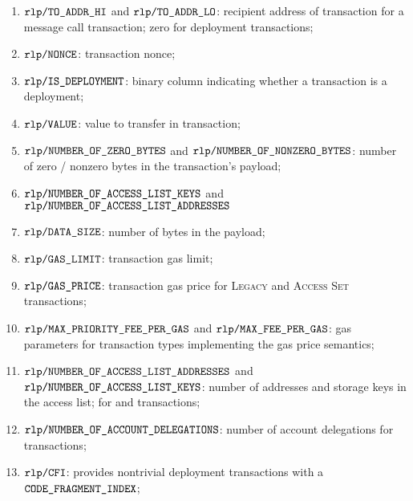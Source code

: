 \begin{enumerate}[resume]
	\item
		$\texttt{rlp} \texttt{/}{\texttt{TO\_ADDR\_HI}}$ and
		$\texttt{rlp} \texttt{/}{\texttt{TO\_ADDR\_LO}}$:
		recipient address of transaction for a message call transaction;
		zero for deployment transactions;
	\item
		$\texttt{rlp} \texttt{/}{\texttt{NONCE}}$:
		transaction nonce;
	\item
		$\texttt{rlp} \texttt{/}{\texttt{IS\_DEPLOYMENT}}$:
		binary column indicating whether a transaction is a deployment;
	\item
		$\texttt{rlp} \texttt{/}{\texttt{VALUE}}$:
		value to transfer in transaction;
	\item
		$\texttt{rlp} \texttt{/}{\texttt{NUMBER\_OF\_ZERO\_BYTES}}$ and
		$\texttt{rlp} \texttt{/}{\texttt{NUMBER\_OF\_NONZERO\_BYTES}}$:
		number of zero / nonzero bytes in the transaction's payload;
	\item
		$\texttt{rlp} \texttt{/}{\texttt{NUMBER\_OF\_ACCESS\_LIST\_KEYS}}$ and
		$\texttt{rlp} \texttt{/}{\texttt{NUMBER\_OF\_ACCESS\_LIST\_ADDRESSES}}$
	\item
		$\texttt{rlp} \texttt{/}{\texttt{DATA\_SIZE}}$:
		number of bytes in the payload;
	\item
		$\texttt{rlp} \texttt{/}{\texttt{GAS\_LIMIT}}$:
		transaction gas limit;
	\item
		$\texttt{rlp} \texttt{/}{\texttt{GAS\_PRICE}}$:
		transaction gas price for
		\textsc{Legacy} and
		\textsc{Access Set} transactions;
	\item
		$\texttt{rlp} \texttt{/}{\texttt{MAX\_PRIORITY\_FEE\_PER\_GAS}} $ and
		$\texttt{rlp} \texttt{/}{\texttt{MAX\_FEE\_PER\_GAS}}         $:
		gas parameters for transaction types implementing the
		\cite{EIP-1559} gas price semantics;
	\item
		$\texttt{rlp} \texttt{/}{\texttt{NUMBER\_OF\_ACCESS\_LIST\_ADDRESSES}}$ and
		$\texttt{rlp} \texttt{/}{\texttt{NUMBER\_OF\_ACCESS\_LIST\_KEYS}}$:
		number of addresses and storage keys in the access list;
		for \cite{EIP-2929} and \cite{EIP-2930} transactions;
	\item
		$\texttt{rlp} \texttt{/}{\texttt{NUMBER\_OF\_ACCOUNT\_DELEGATIONS}}$:
		number of account delegations
		for \cite{EIP-7702} transactions;
	\item
		$\texttt{rlp} \texttt{/}{\texttt{\texttt{CFI}}}$:
		provides nontrivial deployment transactions with a $\texttt{CODE\_FRAGMENT\_INDEX}$;
\end{enumerate}
